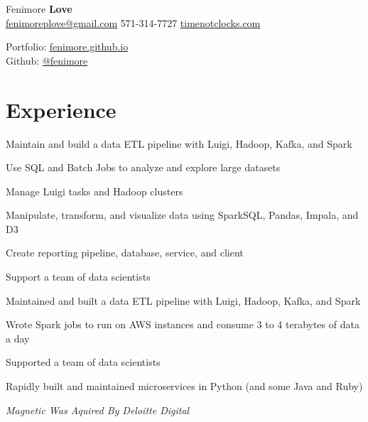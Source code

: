 \documentclass[]{deedy-resume-openfont}
\begin{document}
%
%

%
%
\hspace{-5.5mm}
\begin{minipage}[t]{.6\textwidth}
{\Huge Fenimore {\textbf{Love}}}\\
\href{mailto:fenimoreplove@gmail.com}{fenimoreplove@gmail.com} \textbullet{} 571-314-7727 \textbullet{} \href{https://timenotclocks.com}{timenotclocks.com}\\
\end{minipage}
\hfill
\begin{minipage}[t]{.3\textwidth}
Portfolio: \href{https://fenimore.github.io}{fenimore.github.io}\\
Github: \href{https://github.com/fenimore}{@fenimore}
\end{minipage}
\namesection{}{} %


\section{Experience}
\vspace{\topsep} %
\begin{tightemize}
\item Maintain and build a data ETL pipeline with Luigi, Hadoop, Kafka, and Spark
\item Use SQL and Batch Jobs to analyze and explore large datasets
\item Manage Luigi tasks and Hadoop clusters
\item Manipulate, transform, and visualize data using SparkSQL, Pandas, Impala, and D3
\item Create reporting pipeline, database, service, and client
\item Support a team of data scientists
\end{tightemize}
\sectionsep

\vspace{\topsep} %
\begin{tightemize}
\item Maintained and built a data ETL pipeline with Luigi, Hadoop, Kafka, and Spark
\item Wrote Spark jobs to run on AWS instances and consume 3 to 4 terabytes of data a day
\item Supported a team of data scientists
\item Rapidly built and maintained microservices in Python (and some Java and Ruby)
\end{tightemize}
\emph{Magnetic Was Aquired By Deloitte Digital}
\sectionsep
\end{document}
